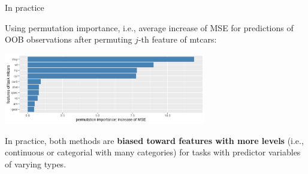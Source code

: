 \documentclass[11pt,compress,t,notes=noshow, xcolor=table]{beamer}
\begin{document}
\begin{vbframe}{In practice}

{\small
Using permutation importance, i.e., average increase of MSE for predictions of OOB observations after permuting $j$-th feature of mtcars:
}

\begin{center}
\includegraphics[width=0.66\textwidth]{figure/forest-fimp_perm.png}
\end{center}

{\small
In practice, both methods are \textbf{biased toward features with more levels} (i.e., continuous or categorial with many categories) for tasks with predictor variables of varying types. 
}

\end{vbframe}

\endlecture
\end{document}
